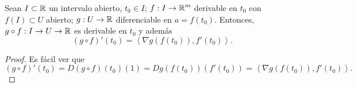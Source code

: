 \begin{colorary}
Sean $\displaystyle I \subset \mathbb{R} $ un intervalo abierto, $\displaystyle t_{0} \in I $; $\displaystyle f : I \to \mathbb{R}^{m} $ derivable en $\displaystyle t_{0} $ con $\displaystyle f\left(I\right) \subset U $ abierto; $\displaystyle g : U \to \mathbb{R} $ diferenciable en $\displaystyle a = f\left(t_{0}\right) $. Entonces, $\displaystyle g\circ f : I \to U \to \mathbb{R} $ es derivable en $\displaystyle t_{0} $ y además
\[\left(g\circ f\right)'\left(t_{0}\right) = \left\langle \nabla g\left(f\left(t_{0}\right)\right), f'\left(t_{0}\right) \right\rangle  .\]
\end{colorary}
\begin{proof}
Es fácil ver que
\[\left(g\circ f\right)'\left(t_{0}\right) = D\left(g\circ f\right)\left(t_{0}\right)\left(1\right) = Dg\left(f\left(t_{0}\right)\right)\left(f'\left(t_{0}\right)\right) = \left\langle \nabla g\left(f\left(t_{0}\right)\right), f'\left(t_{0}\right) \right\rangle  .\]
\end{proof}

